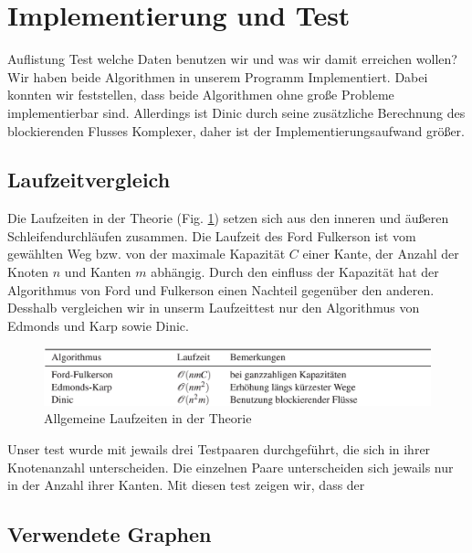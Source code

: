 \documentclass[a4paper]{llncs}
\begin{document}
\section{Implementierung und Test}
\label{Experimente}
Auflistung Test welche Daten benutzen wir und was wir damit erreichen wollen?
Wir haben beide Algorithmen in unserem Programm Implementiert. Dabei konnten wir feststellen, dass beide Algorithmen ohne große Probleme implementierbar sind. Allerdings ist Dinic durch seine zusätzliche Berechnung des blockierenden Flusses Komplexer, daher ist der Implementierungsaufwand größer.
\subsection{Laufzeitvergleich}
Die Laufzeiten in der Theorie (Fig. \ref{fig:lzvergleich}) setzen sich aus den inneren und äußeren Schleifendurchläufen zusammen.
Die Laufzeit des Ford Fulkerson ist vom gewählten Weg bzw. von der maximale Kapazität $C$ einer Kante, der Anzahl der Knoten $n$ und Kanten $m$  abhängig.
Durch den einfluss der Kapazität hat der Algorithmus von Ford und Fulkerson einen Nachteil gegenüber den anderen.
Desshalb vergleichen wir in unserm Laufzeittest nur den Algorithmus von Edmonds und Karp sowie Dinic.
\begin{figure}[H] 
  \centering
     \includegraphics[scale=0.42]{lzvergleich} 
  \caption{Allgemeine Laufzeiten in der Theorie \citep{GKuA}}
  \label{fig:lzvergleich}
\end{figure}
Unser test wurde mit jewails drei Testpaaren durchgeführt, die sich in ihrer Knotenanzahl unterscheiden.
Die einzelnen Paare unterscheiden sich jewails nur in der Anzahl ihrer Kanten.
Mit diesen test zeigen wir, dass der 


\newpage

\subsection{Verwendete Graphen}
\end{document}
